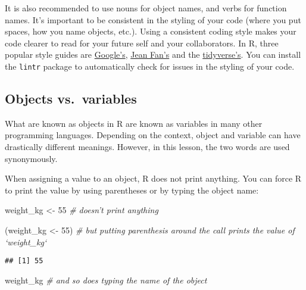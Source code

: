 \documentclass[]{book}
\newenvironment{Shaded}{\begin{snugshade}}{\end{snugshade}}
\newcommand{\DecValTok}[1]{\textcolor[rgb]{0.00,0.00,0.81}{#1}}
\newcommand{\StringTok}[1]{\textcolor[rgb]{0.31,0.60,0.02}{#1}}
\newcommand{\CommentTok}[1]{\textcolor[rgb]{0.56,0.35,0.01}{\textit{#1}}}
\newcommand{\NormalTok}[1]{#1}
\begin{document}
It is also recommended to use nouns for object names, and verbs for
function names. It's important to be consistent in the styling of your
code (where you put spaces, how you name objects, etc.). Using a
consistent coding style makes your code clearer to read for your future
self and your collaborators. In R, three popular style guides are
\href{https://google.github.io/styleguide/Rguide.html}{Google's},
\href{\%5Bhttp://jef.works/R-style-guide/}{Jean Fan's} and the
\href{https://style.tidyverse.org/}{tidyverse's}. You can install the
\texttt{lintr} package to automatically check for issues in the styling
of your code.

\subsection{Objects vs.~variables}\label{objects-vs.variables}

What are known as objects in R are known as variables in many other
programming languages. Depending on the context, object and variable can
have drastically different meanings. However, in this lesson, the two
words are used synonymously.

When assigning a value to an object, R does not print anything. You can
force R to print the value by using parentheses or by typing the object
name:

\begin{Shaded}
\begin{Highlighting}[]
\NormalTok{weight_kg <-}\StringTok{ }\DecValTok{55}  \CommentTok{# doesn't print anything}
\end{Highlighting}
\end{Shaded}

\begin{Shaded}
\begin{Highlighting}[]
\NormalTok{(weight_kg <-}\StringTok{ }\DecValTok{55}\NormalTok{)  }\CommentTok{# but putting parenthesis around the call prints the value of `weight_kg`}
\end{Highlighting}
\end{Shaded}

\begin{verbatim}
## [1] 55
\end{verbatim}

\begin{Shaded}
\begin{Highlighting}[]
\NormalTok{weight_kg }\CommentTok{# and so does typing the name of the object}
\end{Highlighting}
\end{Shaded}
\end{document}
